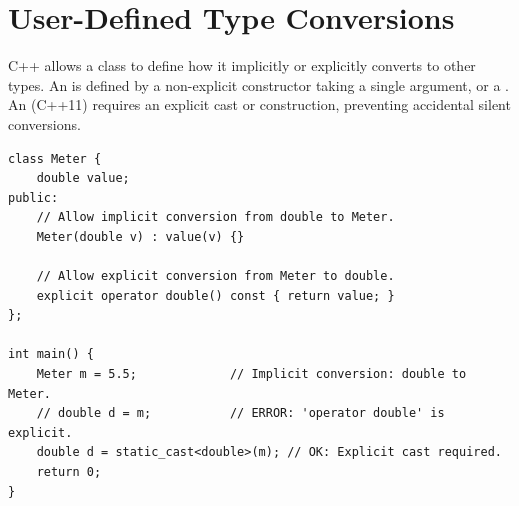 \section{User-Defined Type Conversions}
C++ allows a class to define how it implicitly or explicitly converts to other types. An  is defined by a non-explicit constructor taking a single argument, or a . An  (C++11) requires an explicit cast or construction, preventing accidental silent conversions.
\begin{lstlisting}
class Meter {
    double value;
public:
    // Allow implicit conversion from double to Meter.
    Meter(double v) : value(v) {}

    // Allow explicit conversion from Meter to double.
    explicit operator double() const { return value; }
};

int main() {
    Meter m = 5.5;             // Implicit conversion: double to Meter.
    // double d = m;           // ERROR: 'operator double' is explicit.
    double d = static_cast<double>(m); // OK: Explicit cast required.
    return 0;
}
\end{lstlisting}


